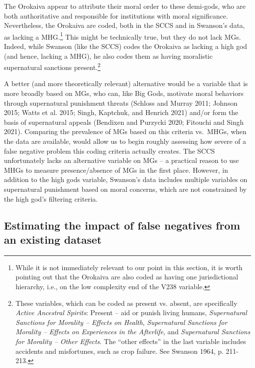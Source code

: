 \documentclass[
]{article}
\begin{document}
The Orokaiva appear to attribute their moral order to these demi-gods, who are both authoritative and responsible for institutions with moral significance. Nevertheless, the Orokaiva are coded, both in the SCCS and in Swanson's data, as lacking a MHG.\footnote{While it is not immediately relevant to our point in this section, it is worth pointing out that the Orokaiva are also coded as having one jurisdictional hierarchy, i.e., on the low complexity end of the V238 variable.} This might be technically true, but they do not lack MGs. Indeed, while Swanson (like the SCCS) codes the Orokaiva as lacking a high god (and hence, lacking a MHG), he also codes them as having moralistic supernatural sanctions present.\footnote{These variables, which can be coded as present vs. absent, are specifically \emph{Active Ancestral Spirits}: Present -- aid or punish living humans, \emph{Supernatural Sanctions for Morality -- Effects on Health}, \emph{Supernatural Sanctions for Morality -- Effects on Experiences in the Afterlife}, and \emph{Supernatural Sanctions for Morality -- Other Effects}. The ``other effects'' in the last variable includes accidents and misfortunes, such as crop failure. See Swanson 1964, p. 211-213.}

A better (and more theoretically relevant) alternative would be a variable that is more broadly based on MGs, who can, like Big Gods, motivate moral behaviors through supernatural punishment threats (Schloss and Murray 2011; Johnson 2015; Watts et al. 2015; Singh, Kaptchuk, and Henrich 2021) and/or form the basis of supernatural appeals (Bendixen and Purzycki 2020; Fitouchi and Singh 2021). Comparing the prevalence of MGs based on this criteria vs.~MHGs, when the data are available, would allow us to begin roughly assessing how severe of a false negative problem this coding criteria actually creates. The SCCS unfortunately lacks an alternative variable on MGs -- a practical reason to use MHGs to measure presence/absence of MGs in the first place. However, in addition to the high gods variable, Swanson's data includes multiple variables on supernatural punishment based on moral concerns, which are not constrained by the high god's filtering criteria.

\subsection{Estimating the impact of false negatives from an existing dataset}
\end{document}
